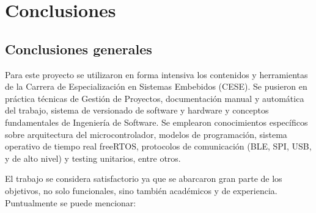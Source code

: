 
\chapter{Conclusiones} %

\label{Chapter5} %




\section{Conclusiones generales }

Para este proyecto se utilizaron en forma intensiva los contenidos y herramientas de la Carrera de Especialización en Sistemas Embebidos (CESE). Se pusieron en práctica técnicas de Gestión de Proyectos, documentación manual y automática del trabajo, sistema de versionado de software y hardware y conceptos fundamentales de Ingeniería de Software. Se emplearon conocimientos específicos sobre arquitectura del microcontrolador, modelos de programación, sistema operativo de tiempo real freeRTOS, protocolos de comunicación (BLE, SPI, USB, y de alto nivel) y testing unitarios, entre otros.

El trabajo se considera satisfactorio ya que se abarcaron gran parte de los objetivos, no solo funcionales, sino también académicos y de experiencia. Puntualmente se puede mencionar:

